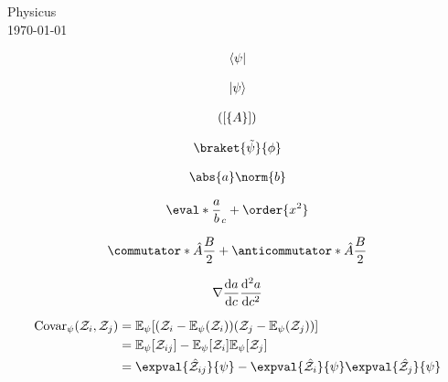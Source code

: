 \documentclass[11pt]{article}
\begin{document}
\begin{center}
  {\Large Physicus} \\ \vspace{5mm}
  \today
\end{center}

\begin{align*}
  \langle\psi\rvert
\end{align*}

\begin{align*}
  \lvert\psi\rangle
\end{align*}

\begin{align*}
  \lparen\lbrack\lbrace A\rbrace\rbrack\rparen
\end{align*}

\begin{align*}
  \braket{\tilde{\psi}}{\phi}
\end{align*}

\begin{align*}
  \abs{a}\norm{b}
\end{align*}

\begin{align*}
  \eval*{\frac{a}{b}}_c + \order{x^2}
\end{align*}

\begin{align*}
  \commutator*{\hat{A}}{\frac{B}{2}} + \anticommutator*{\hat{A}}{\frac{B}{2}}
\end{align*}

\begin{align*}
  \grad\dv{a}{c}\dv[2]{a}{c}
\end{align*}

\begin{align*}
  \text{Covar}_\psi\pqty{\mathcal{Z}_i,\mathcal{Z}_j}
  & = \mathbb{E}_\psi\bqty{ \pqty{\mathcal{Z}_i - \mathbb{E}_\psi\pqty{ \mathcal{Z}_i}} \pqty{\mathcal{Z}_j - \mathbb{E}_\psi\pqty{ \mathcal{Z}_j}} } \\
  & = \mathbb{E}_\psi\bqty*{\mathcal{Z}_{ij}} - \mathbb{E}_\psi\bqty*{\mathcal{Z}_i}\mathbb{E}_\psi\bqty*{\mathcal{Z}_j}                              \\
  & = \expval{\hat{\mathcal{Z}}_{ij}}{\psi} - \expval{\hat{\mathcal{Z}}_{i}}{\psi}\expval{\hat{\mathcal{Z}}_{j}}{\psi}
\end{align*}
\end{document}
